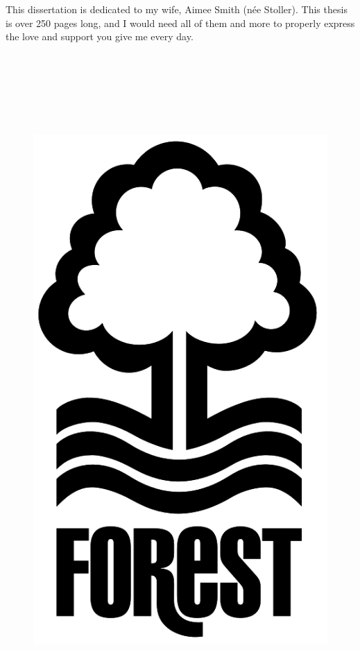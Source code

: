 \documentclass[12pt]{report}
\begin{document}
This dissertation is dedicated to my wife, Aimee Smith (n\'ee Stoller). This thesis is over 250 pages long, and I would need all of them and more to properly express the love and support you give me every day.
\\
\\
\\
\\
\\
\\
\\

\begin{figure}[H]
\centering
\includegraphics[scale=0.3]{images/nffc_logo.png}
\label{fig:nffc_logo}
\end{figure}
\end{document}
